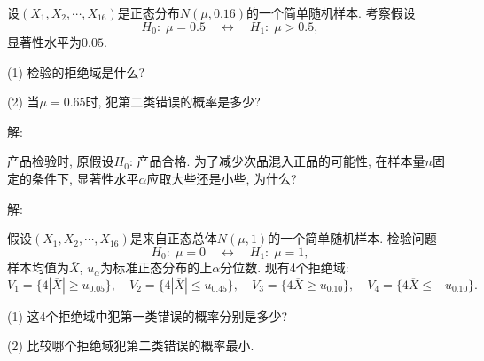 \documentclass[standard]{ExBook}
\begin{document}
\begin{qitems}
    \begin{bbox}
    \begin{shaded}
        \qitem
设$\left(X_1, X_2, \cdots, X_{16}\right)$是正态分布$N(\mu, 0.16)$的一个简单随机样本. 考察假设
\[
H_0: \; \mu = 0.5 \quad \longleftrightarrow \quad H_1: \; \mu > 0.5,
\]
显著性水平为$0.05$.

(1) 检验的拒绝域是什么?

(2) 当$\mu = 0.65$时, 犯第二类错误的概率是多少?
    \end{shaded}
    \end{bbox}

\vspace{-5em}

    \begin{bbox}
解: 
    \end{bbox}

\vspace{-5em}

    \begin{bbox} 
    \begin{shaded}
        \qitem
产品检验时, 原假设$H_0$: 产品合格. 为了减少次品混入正品的可能性, 在样本量$n$固定的条件下, 显著性水平$\alpha$应取大些还是小些, 为什么?
    \end{shaded}
    \end{bbox}

\vspace{-5em}

    \begin{bbox}
解: 
    \end{bbox}

\vspace{-5em}

    \begin{bbox} 
    \begin{shaded}
        \qitem
假设$\left(X_1, X_2, \cdots, X_{16}\right)$是来自正态总体$N(\mu, 1)$的一个简单随机样本. 检验问题
\[
H_0: \; \mu = 0 \quad \longleftrightarrow \quad H_1: \; \mu = 1,
\]
样本均值为$\bar X$, $u_{\alpha}$为标准正态分布的上$\alpha$分位数. 现有4个拒绝域:
\[
V_1 = \{4|\overline{X}| \ge u_{0.05}\}, \quad
V_2 = \{4|\overline{X}| \le u_{0.45}\}, \quad
V_3 = \{4\overline{X} \ge u_{0.10}\}, \quad
V_4 = \{4\overline{X} \le -u_{0.10}\}.
\]

(1) 这4个拒绝域中犯第一类错误的概率分别是多少?

(2) 比较哪个拒绝域犯第二类错误的概率最小.
    \end{shaded}
    \end{bbox}


\end{qitems}
\end{document}
